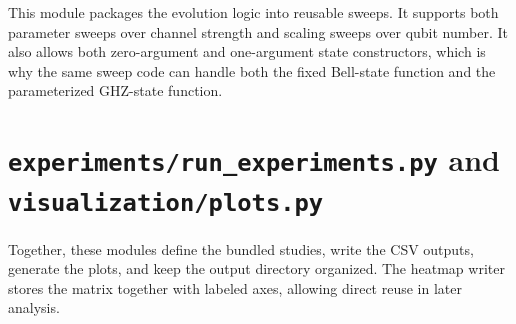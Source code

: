 This module packages the evolution logic into reusable sweeps. It supports both parameter sweeps over channel strength and scaling sweeps over qubit number. It also allows both zero-argument and one-argument state constructors, which is why the same sweep code can handle both the fixed Bell-state function and the parameterized GHZ-state function.

\section{\texttt{experiments/run\_experiments.py} and \texttt{visualization/plots.py}}

Together, these modules define the bundled studies, write the CSV outputs, generate the plots, and keep the output directory organized. The heatmap writer stores the matrix together with labeled axes, allowing direct reuse in later analysis.
